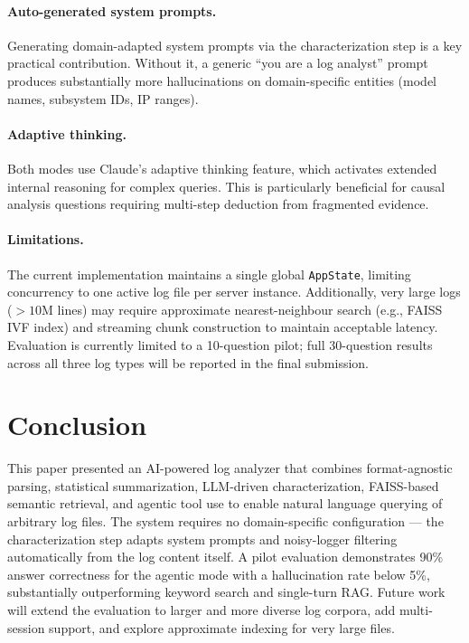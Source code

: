 \documentclass[runningheads]{llncs}
\begin{document}
\paragraph{Auto-generated system prompts.}
Generating domain-adapted system prompts via the characterization step is a
key practical contribution. Without it, a generic ``you are a log analyst''
prompt produces substantially more hallucinations on domain-specific entities
(model names, subsystem IDs, IP ranges).

\paragraph{Adaptive thinking.}
Both modes use Claude's adaptive thinking feature, which activates extended
internal reasoning for complex queries. This is particularly beneficial for
causal analysis questions requiring multi-step deduction from fragmented
evidence.

\paragraph{Limitations.}
The current implementation maintains a single global \texttt{AppState},
limiting concurrency to one active log file per server instance. Additionally,
very large logs ($>10$M lines) may require approximate nearest-neighbour
search (e.g., FAISS IVF index) and streaming chunk construction to maintain
acceptable latency. Evaluation is currently limited to a 10-question pilot;
full 30-question results across all three log types will be reported in the
final submission.

\section{Conclusion}
\label{sec:conclusion}

This paper presented an AI-powered log analyzer that combines format-agnostic
parsing, statistical summarization, LLM-driven characterization, FAISS-based
semantic retrieval, and agentic tool use to enable natural language querying
of arbitrary log files. The system requires no domain-specific configuration
--- the characterization step adapts system prompts and noisy-logger filtering
automatically from the log content itself. A pilot evaluation demonstrates
90\% answer correctness for the agentic mode with a hallucination rate below
5\%, substantially outperforming keyword search and single-turn RAG. Future
work will extend the evaluation to larger and more diverse log corpora, add
multi-session support, and explore approximate indexing for very large files.



\end{document}
